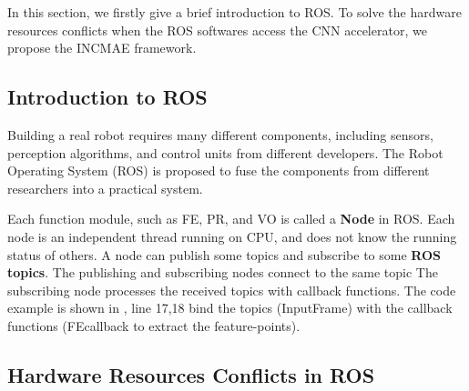 \label{sec:incame}

In this section, we firstly give a brief introduction to ROS\cite{quigley2009ros}. To solve the hardware resources conflicts when the ROS softwares access the CNN accelerator, we propose the INCMAE framework.




\subsection{Introduction to ROS}
Building a real robot requires many different components, including sensors, perception algorithms, and control units from different developers. The Robot Operating System (ROS) \cite{quigley2009ros} is proposed to fuse the components from different researchers into a practical system.

Each function module, such as FE, PR, and VO is called a \textbf{Node} in ROS. Each node is an independent thread running on CPU, and does not know the running status of others. 
A node can publish some topics and subscribe to some \textbf{ROS topics}. The publishing and subscribing nodes connect to the same topic
The subscribing node processes the received topics with callback functions. The code example is shown in , line 17,18 bind the topics (InputFrame) with the callback functions (FEcallback to extract the feature-points). 






 

\subsection{Hardware Resources Conflicts in ROS}

